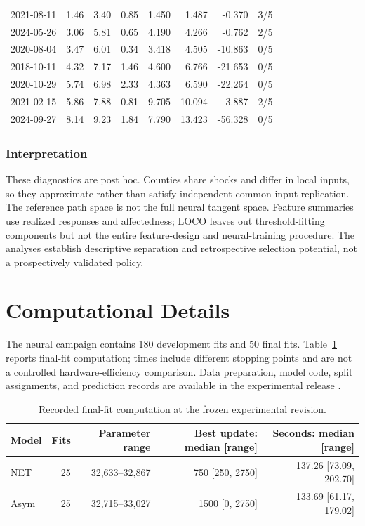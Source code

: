 \begin{table}[htbp]
\begin{tabular}{@{}lrrrrrrr@{}}
2021-08-11 & 1.46 & 3.40 & 0.85 & 1.450 & 1.487 & -0.370 & 3/5 \\
2024-05-26 & 3.06 & 5.81 & 0.65 & 4.190 & 4.266 & -0.762 & 2/5 \\
2020-08-04 & 3.47 & 6.01 & 0.34 & 3.418 & 4.505 & -10.863 & 0/5 \\
2018-10-11 & 4.32 & 7.17 & 1.46 & 4.600 & 6.766 & -21.653 & 0/5 \\
2020-10-29 & 5.74 & 6.98 & 2.33 & 4.363 & 6.590 & -22.264 & 0/5 \\
2021-02-15 & 5.86 & 7.88 & 0.81 & 9.705 & 10.094 & -3.887 & 2/5 \\
2024-09-27 & 8.14 & 9.23 & 1.84 & 7.790 & 13.423 & -56.328 & 0/5 \\
\bottomrule\end{tabular}
\end{table}

\subsubsection{Interpretation}\label{app:feature_scope}
These diagnostics are post hoc. Counties share shocks and differ in local inputs, so they approximate rather than satisfy independent common-input replication. The reference path space is not the full neural tangent space. Feature summaries use realized responses and affectedness; LOCO leaves out threshold-fitting components but not the entire feature-design and neural-training procedure. The analyses establish descriptive separation and retrospective selection potential, not a prospectively validated policy.

\section{Computational Details}\label{app:repro_all}
The neural campaign contains 180 development fits and 50 final fits. Table~\ref{tab:runtime} reports final-fit computation; times include different stopping points and are not a controlled hardware-efficiency comparison. Data preparation, model code, split assignments, and prediction records are available in the experimental release \citep{affectedcv2026}.

\begin{table}[htbp]\centering\caption{Recorded final-fit computation at the frozen experimental revision.}\label{tab:runtime}\begin{tabular}{lrrrr}\toprule
Model & Fits & Parameter range & Best update: median [range] & Seconds: median [range]\\\midrule
NET & 25 & 32,633--32,867 & 750 [250, 2750] & 137.26 [73.09, 202.70]\\
Asym & 25 & 32,715--33,027 & 1500 [0, 2750] & 133.69 [61.17, 179.02]\\
\bottomrule\end{tabular}\end{table}

